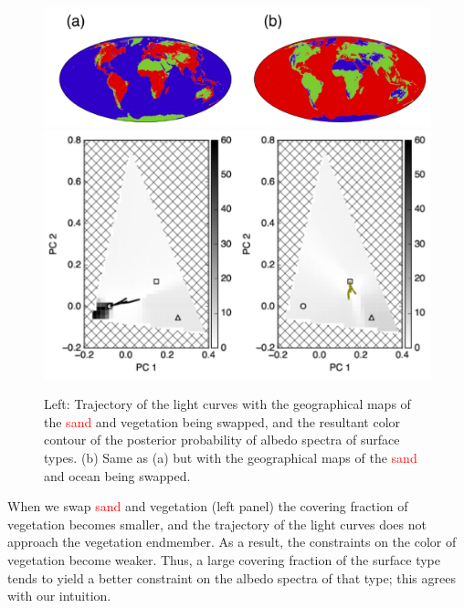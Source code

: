 \documentclass[iop,numberedappendix,apj]{emulateapj}
\def\edit#1{\textcolor{red}{#1}}
\begin{document}
\begin{figure}[htb!]
    \begin{center}
    \includegraphics[width=\hsize]{swap_map.pdf}
    \includegraphics[width=\hsize]{mockdata_90deg_3types23_t360_lc_noreg_allowedregion_gray.pdf}
    \end{center}
    \caption{Left: Trajectory of the light curves with the geographical maps of the \edit{sand} and vegetation being swapped, and the resultant color contour of the posterior probability of albedo spectra of surface types. (b) Same as (a) but with the geographical maps of the \edit{sand} and ocean being swapped.}
\label{fig:swap}
\end{figure}

When we swap \edit{sand} and vegetation (left panel) the covering fraction of vegetation becomes smaller, and the trajectory of the light curves does not approach the vegetation endmember. As a result, the constraints on the color of vegetation become weaker. Thus, a large covering fraction of the surface type tends to yield a better constraint on the albedo spectra of that type; this agrees with our intuition.  
\end{document}
